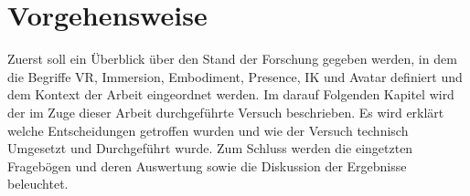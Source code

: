 \section{Vorgehensweise}
Zuerst soll ein Überblick über den Stand der Forschung gegeben werden, in dem die Begriffe VR, Immersion, Embodiment, Presence, IK und Avatar definiert und dem Kontext der Arbeit eingeordnet werden. Im darauf Folgenden Kapitel wird der im Zuge dieser Arbeit durchgeführte Versuch beschrieben. Es wird erklärt welche Entscheidungen getroffen wurden und wie der Versuch technisch Umgesetzt und Durchgeführt wurde. Zum Schluss werden die eingetzten Fragebögen und deren Auswertung sowie die Diskussion der Ergebnisse beleuchtet.